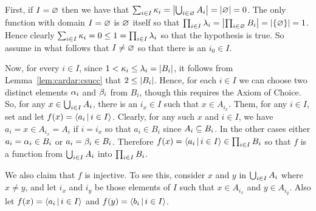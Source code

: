 {{    First, if $I = \es$ then we have that $\sum_{i \in I} \k_i = \abs{\bigcup_{i \in \es} A_i} = \abs{\es} = 0$.
    The only function with domain $I = \es$ is $\es$ itself so that $\prodi \l_i = \abs{\prod_{i \in \es} B_i} = \abs{\braces{\es}} = 1$.
    Hence clearly $\sumi \k_i = 0 \leq 1 = \prodi \l_i$ so that the hypothesis is true.
    So assume in what follows that $I \neq \es$ so that there is an $i_0 \in I$.

    Now, for every $i \in I$, since $1 < \k_i \leq \l_i = \abs{B_i}$, it follows from Lemma~\ref{lem:cardar:csucc} that $2 \leq \abs{B_i}$.
    Hence, for each $i \in I$ we can choose two distinct elements $\a_i$ and $\b_i$ from $B_i$, though this requires the Axiom of Choice.
    So, for any $x \in \uni A_i$, there is an $i_x \in I$ such that $x \in A_{i_x}$.
    Them, for any $i \in I$, set
    and let $f(x) = \angles{a_i \where i \in I}$.
    Clearly, for any such $x$ and $i \in I$, we have $a_i = x \in A_{i_x} = A_i$ if $i = i_x$ so that $a_i \in B_i$ since $A_i \ss B_i$.
    In the other cases either $a_i = \a_i \in B_i$ or $a_i = \b_i \in B_i$.
    Therefore $f(x) = \angles{a_i \where i \in I} \in \prodi B_i$ so that $f$ is a function from $\uni A_i$ into $\prodi B_i$.

    We also claim that $f$ is injective.
    To see this, consider $x$ and $y$ in $\uni A_i$ where $x \neq y$, and let $i_x$ and $i_y$ be those elements of $I$ such that $x \in A_{i_x}$ and $y \in A_{i_y}$.
    Also let $f(x) = \angles{a_i \where i \in I}$ and $f(y) = \angles{b_i \where i \in I}$.

}}
